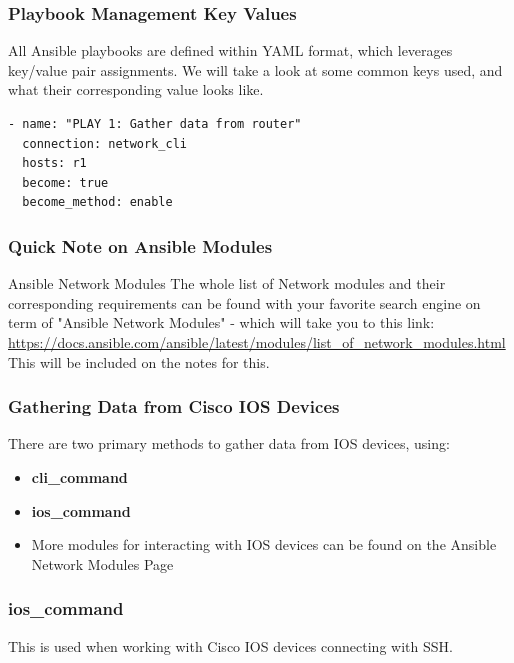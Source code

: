 \documentclass{beamer}
\begin{document}
\begin{frame}[fragile]
    \frametitle{Playbook Management Key Values}
    All Ansible playbooks are defined within YAML format, which leverages key/value
    pair assignments. We will take a look at some common keys used, and what their
    corresponding value looks like.
\begin{verbatim}
- name: "PLAY 1: Gather data from router"
  connection: network_cli
  hosts: r1
  become: true
  become_method: enable
\end{verbatim}
\end{frame}

\begin{frame}
  \frametitle{Quick Note on Ansible Modules}
  \begin{block}{Ansible Network Modules}
    The whole list of Network modules and their corresponding requirements
    can be found with your favorite search engine on term of "Ansible Network Modules" 
    - which will take you to this link: \url{https://docs.ansible.com/ansible/latest/modules/list_of_network_modules.html}
    This will be included on the notes for this.
    \end{block}
\end{frame}

\begin{frame}
    \frametitle{Gathering Data from Cisco IOS Devices}
    There are two primary methods to gather data from IOS devices, using:
    \begin{itemize}
        \item<2-> \textbf{cli\_command}
        \item<3-> \textbf{ios\_command}
        \item<4-> More modules for interacting with IOS devices can be found on the Ansible Network Modules Page
    \end{itemize}
\end{frame}

\begin{frame}
    \frametitle{ios\_command}
    This is used when working with Cisco IOS devices connecting with SSH.
    
\end{frame}
\end{document}
